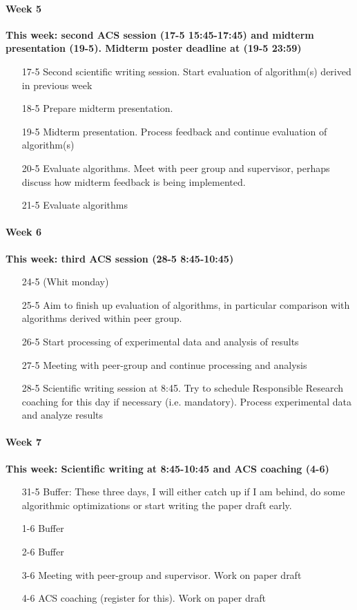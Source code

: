 \documentclass[a4paper,10pt,english]{article}
\begin{document}
	\paragraph{Week 5} \textbf{This week: second ACS session (17-5 15:45-17:45) and midterm presentation (19-5). Midterm poster deadline at (19-5 23:59)}
	\begin{enumerate}
		\item[17-5 ] Second scientific writing session. Start evaluation of algorithm(s) derived in previous week
		\item[18-5 ] Prepare midterm presentation.
		\item[19-5 ] Midterm presentation. Process feedback and continue evaluation of algorithm(s)
		\item[20-5 ] Evaluate algorithms. Meet with peer group and supervisor, perhaps discuss how midterm feedback is being implemented.
		\item[21-5 ] Evaluate algorithms
	\end{enumerate}
	\paragraph{Week 6} \textbf{This week: third ACS session (28-5 8:45-10:45)}
	\begin{enumerate}
		\item[24-5 ] (Whit monday)
		\item[25-5 ] Aim to finish up evaluation of algorithms, in particular comparison with algorithms derived within peer group.
		\item[26-5 ] Start processing of experimental data and analysis of results
		\item[27-5 ] Meeting with peer-group and continue processing and analysis
		\item[28-5 ] Scientific writing session at 8:45. Try to schedule Responsible Research coaching for this day if necessary (i.e. mandatory). Process experimental data and analyze results
	\end{enumerate}
	\paragraph{Week 7} \textbf{This week: Scientific writing at 8:45-10:45 and ACS coaching (4-6)}
	\begin{enumerate}
		\item[31-5 ] Buffer: These three days, I will either catch up if I am behind, do some algorithmic optimizations or start writing the paper draft early.
		\item[1-6 ] Buffer
		\item[2-6 ] Buffer
		\item[3-6 ] Meeting with peer-group and supervisor. Work on paper draft
		\item[4-6 ] ACS coaching (register for this). Work on paper draft 
	\end{enumerate}
\end{document}
